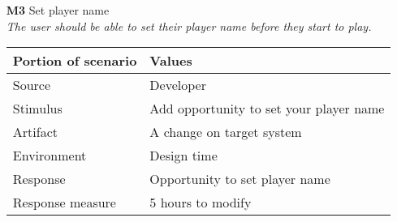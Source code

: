 \begin{itemize}
        \item[\textbf{M3}] Set player name \\
        \textit{\small{The user should be able to set their player name before they start to play.}}
        
        \begin{tabular}{| l | l |}
            \hline
            \rowcolor[gray]{0.8}
            \textbf{Portion of scenario} & \textbf{Values} \\
            \hline
            Source & Developer \\
            Stimulus & Add opportunity to set your player name \\
            Artifact & A change on target system \\
            Environment & Design time \\
            Response & Opportunity to set player name  \\
            Response measure & 5 hours to modify \\
            \hline
        \end{tabular}
    \end{itemize}

